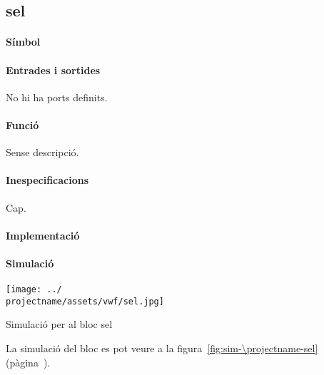 \subsection{\label{sub:\projectname-sel} \textsf{sel}}

\paragraph{Símbol}

\begin{center}  \end{center}

\paragraph{Entrades i sortides}

No hi ha ports definits.

\paragraph{Funció}

Sense descripció.

\paragraph{Inespecificacions}

Cap.

\paragraph{Implementació}





\paragraph{Simulació}

\begin{contendfig}
  \begin{center}
    \texttt{[image: ../\\projectname/assets/vwf/sel.jpg]}
  \end{center}
  \caption{\label{fig:sim-\projectname-sel} Simulació per al bloc \textsf{sel}}
\end{contendfig}

La simulació del bloc es pot veure a la figura~\ref{fig:sim-\projectname-sel} (pàgina~\pageref{fig:sim-\projectname-sel}).


\vspace{1cm}
